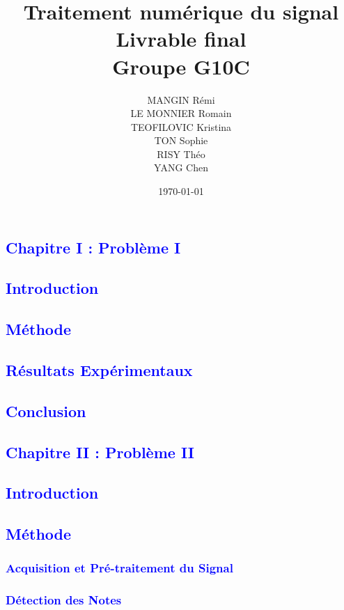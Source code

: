 \documentclass{article}
\title{Traitement numérique du signal \\ \vspace{5mm} Livrable final \\ \vspace{3mm} Groupe G10C }
\author{MANGIN Rémi \\
LE MONNIER Romain \\
TEOFILOVIC Kristina \\
TON Sophie \\
RISY Théo \\
YANG Chen}
\date{\today}
\numberwithin{equation}{section}
\begin{document}
\maketitle

\newpage
\tableofcontents
\newpage

\newpage
\textcolor{blue}{\section{Chapitre I : Problème I}}
\textcolor{blue}{\subsection{Introduction}}

\textcolor{blue}{\subsection{Méthode}}
\textcolor{blue}{\subsection{Résultats Expérimentaux}}

\textcolor{blue}{\subsection{Conclusion}}

\textcolor{blue}{\section{Chapitre II : Problème II}}
\textcolor{blue}{\subsection{Introduction}}

\textcolor{blue}{\subsection{Méthode}}

\textcolor{blue}{\subsubsection{Acquisition et Pré-traitement du Signal}}

\newpage
\textcolor{blue}{\subsubsection{Détection des Notes}}
\end{document}
